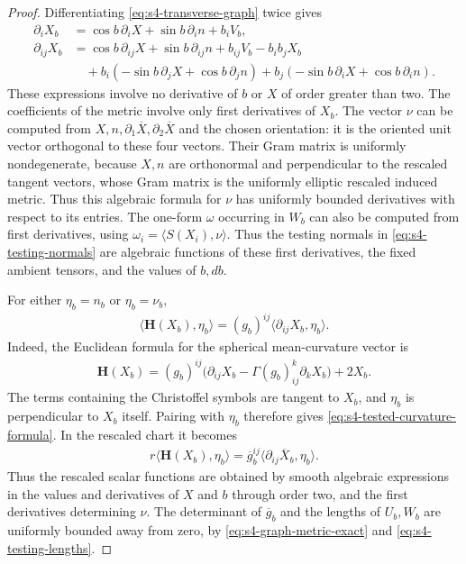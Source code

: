 \documentclass[a4paper,11pt,oneside,reqno]{amsart}
\numberwithin{equation}{section}
\theoremstyle{definition}
\begin{document}
\begin{proof}
    Differentiating \eqref{eq:s4-transverse-graph} twice gives
    \begin{align*}
        \partial_iX_b
        &=\cos b\,\partial_iX+\sin b\,\partial_i n
        +b_iV_b,\\
        \partial_{ij}X_b
        &=\cos b\,\partial_{ij}X+\sin b\,\partial_{ij}n
        +b_{ij}V_b-b_ib_jX_b\\
        &\quad +b_i(-\sin b\,\partial_jX
        +\cos b\,\partial_j n)
        +b_j(-\sin b\,\partial_iX
        +\cos b\,\partial_i n).
    \end{align*}
    These expressions involve no derivative of $b$ or $X$
    of order greater than two. The coefficients of the metric
    involve only first derivatives of $X_b$. The vector $\nu$
    can be computed from $X,n,\partial_1\overline X,
    \partial_2\overline X$ and the chosen orientation:
    it is the oriented unit vector orthogonal to these four
    vectors. Their Gram matrix is uniformly nondegenerate,
    because $X,n$ are orthonormal and perpendicular to the
    rescaled tangent vectors, whose Gram matrix is the
    uniformly elliptic rescaled induced metric. Thus this
    algebraic formula for $\nu$ has uniformly bounded
    derivatives with respect to its entries. The
    one-form $\omega$ occurring in $W_b$ can also be computed
    from first derivatives, using
    $\omega_i=\langle S(X_i),\nu\rangle$.
    Thus the testing normals in
    \eqref{eq:s4-testing-normals} are algebraic functions of
    these first derivatives, the fixed ambient tensors, and
    the values of $b,db$.

    For either $\eta_b=n_b$ or $\eta_b=\nu_b$,
    \begin{align}
        \label{eq:s4-tested-curvature-formula}
        \langle\mathbf{H}(X_b),\eta_b\rangle
        =(g_b)^{ij}\langle\partial_{ij}X_b,\eta_b\rangle.
    \end{align}
    Indeed, the Euclidean formula for the spherical
    mean-curvature vector is
    \begin{align*}
        \mathbf H(X_b)
        =(g_b)^{ij}
        \bigl(\partial_{ij}X_b-\Gamma(g_b)^k_{ij}
                       \partial_kX_b\bigr)+2X_b.
    \end{align*}
    The terms containing the Christoffel symbols are tangent
    to $X_b$, and $\eta_b$ is perpendicular to $X_b$ itself.
    Pairing with $\eta_b$ therefore gives
    \eqref{eq:s4-tested-curvature-formula}. In the rescaled
    chart it becomes
    \begin{align*}
        r\langle\mathbf{H}(X_b),\eta_b\rangle
        =\overline g_b^{ij}
        \langle\partial_{ij}\overline X_b,\eta_b\rangle.
    \end{align*}
    Thus the rescaled scalar functions are obtained by smooth
    algebraic expressions in the values and derivatives of
    $X$ and $b$ through order two, and the first derivatives
    determining $\nu$. The determinant of $\overline g_b$
    and the lengths of $U_b,W_b$ are uniformly bounded away
    from zero,
    by \eqref{eq:s4-graph-metric-exact} and
    \eqref{eq:s4-testing-lengths}.


\end{proof}
\end{document}
